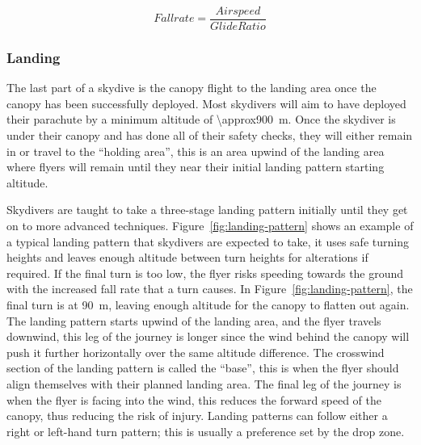 \begin{equation}\label{eq:fallrate}
  Fallrate = \frac{Airspeed}{Glide Ratio}
\end{equation}

\subsubsection{Landing}
The last part of a skydive is the canopy flight to the landing area once the canopy has been successfully deployed. Most skydivers will aim to have deployed their parachute by a minimum altitude of \SI{\approx900}{\metre}.
Once the skydiver is under their canopy and has done all of their safety checks, they will either remain in or travel to the ``holding area'', this is an area upwind of the landing area where flyers will remain until they near their initial landing pattern starting altitude.

Skydivers are taught to take a three-stage landing pattern initially until they get on to more advanced techniques. Figure~\vref{fig:landing-pattern} shows an example of a typical landing pattern that skydivers are expected to take, it uses safe turning heights and leaves enough altitude between turn heights for alterations if required. If the final turn is too low, the flyer risks speeding towards the ground with the increased fall rate that a turn causes. In Figure~\vref{fig:landing-pattern}, the final turn is at \SI{90}{\metre}, leaving enough altitude for the canopy to flatten out again. The landing pattern starts upwind of the landing area, and the flyer travels downwind, this leg of the journey is longer since the wind behind the canopy will push it further horizontally over the same altitude difference. The crosswind section of the landing pattern is called the ``base'', this is when the flyer should align themselves with their planned landing area. The final leg of the journey is when the flyer is facing into the wind, this reduces the forward speed of the canopy, thus reducing the risk of injury. Landing patterns can follow either a right or left-hand turn pattern; this is usually a preference set by the drop zone.

